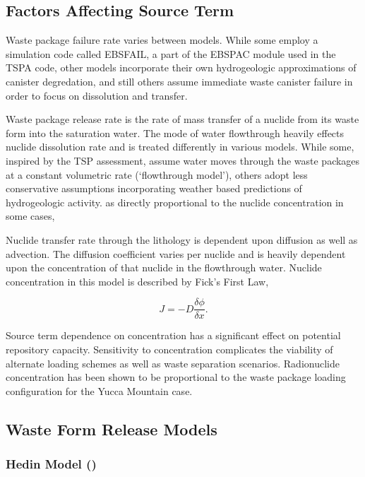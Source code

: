 \subsection{Factors Affecting Source Term}

Waste package failure rate varies between models. While some employ a 
simulation code called EBSFAIL, a part of the EBSPAC module used in 
the TSPA code, other models incorporate their own hydrogeologic 
approximations of canister degredation, and still others assume 
immediate waste canister failure in order to focus on dissolution and 
transfer. 

Waste package release rate is the rate of mass transfer of a nuclide 
from its waste form into the saturation water.
The mode of water flowthrough heavily effects nuclide dissolution rate 
and is treated differently in various models. While some, inspired by 
the TSP assessment, assume water moves through the waste packages at a 
constant volumetric rate (`flowthrough model'), others adopt less 
conservative assumptions incorporating weather based predictions of 
hydrogeologic activity. as directly proportional to the nuclide 
concentration in some cases,  

Nuclide transfer rate through the lithology is  dependent upon 
diffusion as well as advection.  The diffusion coefficient varies per 
nuclide and is heavily dependent upon the concentration of that 
nuclide in the flowthrough water. Nuclide concentration in this model 
is described by Fick's First Law, 

\begin{equation}
J = -D\frac{\delta\phi}{\delta x}.
\end{equation}

Source term dependence on concentration has a significant effect on 
potential repository capacity. Sensitivity to concentration 
complicates the viability of alternate loading schemes as well as 
waste separation scenarios. Radionuclide concentration has been shown 
to be proportional to the waste package loading configuration for the 
Yucca Mountain 
case.\cite{ahn_relationship_2002,kawasaki_congruent_2004}


\subsection{Waste Form Release Models}

\subsubsection{Hedin Model (\cite{hedin_integrated_2002})}

